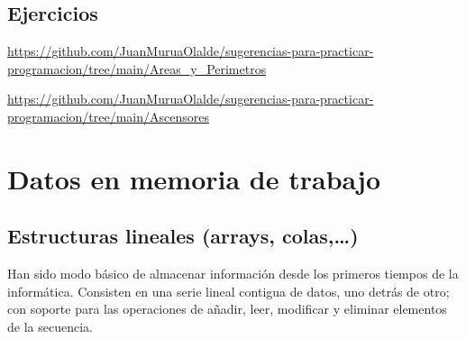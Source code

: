 \documentclass[spanish,12pt,a4paper,final,oneside]{book}
\begin{document}
\section{Ejercicios}

\url{https://github.com/JuanMuruaOlalde/sugerencias-para-practicar-programacion/tree/main/Areas_y_Perimetros}

\url{https://github.com/JuanMuruaOlalde/sugerencias-para-practicar-programacion/tree/main/Ascensores}




\chapter{Datos en memoria de trabajo}


\section{Estructuras lineales (arrays, colas,\ldots)}
Han sido modo básico de almacenar información desde los primeros tiempos de la informática. Consisten en una serie lineal contigua de datos, uno detrás de otro; con soporte para las operaciones de añadir, leer, modificar y eliminar elementos de la secuencia.
\end{document}
